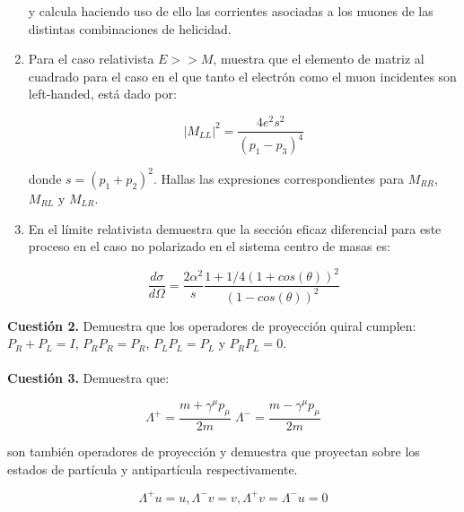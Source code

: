 \documentclass[paper=a4, fontsize=11pt]{scrartcl} %
\numberwithin{equation}{section} %
\numberwithin{figure}{section} %
\numberwithin{table}{section} %
\begin{document}
\begin{enumerate}
y calcula haciendo uso de ello las corrientes asociadas a los muones de las distintas combinaciones de helicidad.

\item Para el caso relativista $E>>M$, muestra que el elemento de matriz al cuadrado para el caso en el que tanto el electrón como el muon incidentes son left-handed, está dado por: 

\begin{equation*}
|M_{LL}|^2 = \frac{4e^2s^2}{(p_1-p_3)^4}
\end{equation*}

donde $s = (p_1 + p_ 2)^2$. Hallas las expresiones correspondientes para $M_{RR}$, $M_{RL}$ y $M_{LR}$.

\item En el límite relativista demuestra que la sección eficaz diferencial para este proceso en el caso no polarizado en el sistema centro de masas es:

\begin{equation*}
\frac{d\sigma}{d\Omega} = \frac{2\alpha^2}{s} \frac{1 + 1/4(1 + cos(\theta))^2}{(1-cos(\theta))^2}
\end{equation*}

\end{enumerate}

\textbf{Cuestión 2.} Demuestra que los operadores de proyección quiral cumplen: $P_R + P_L = I$, $P_RP_R=P_R$, $P_LP_L=P_L$ y $P_RP_L=0$. 
\\
\\
\textbf{Cuestión 3.} Demuestra que:

\begin{equation*}
\Lambda^+ = \frac{m+\gamma^\mu p_\mu}{2m}\; \Lambda^- = \frac{m-\gamma^\mu p_\mu}{2m} 
\end{equation*}

son también operadores de proyección y demuestra que proyectan sobre los estados de partícula y antipartícula respectivamente.

\begin{equation*}
\Lambda^+ u= u, \Lambda^- v= v, \Lambda^+ v = \Lambda^- u = 0 
\end{equation*}
\end{document}
